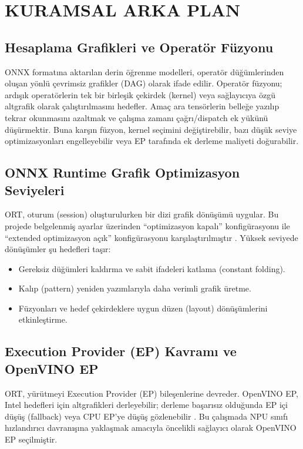 \chapter{KURAMSAL ARKA PLAN}

\section{Hesaplama Grafikleri ve Operatör Füzyonu}
ONNX formatına aktarılan derin öğrenme modelleri, operatör düğümlerinden oluşan yönlü çevrimsiz grafikler (DAG) olarak ifade edilir.
Operatör füzyonu; ardışık operatörlerin tek bir birleşik çekirdek (kernel) veya sağlayıcıya özgü altgrafik olarak çalıştırılmasını hedefler.
Amaç ara tensörlerin belleğe yazılıp tekrar okunmasını azaltmak ve çalışma zamanı çağrı/dispatch ek yükünü düşürmektir.
Buna karşın füzyon, kernel seçimini değiştirebilir, bazı düşük seviye optimizasyonları engelleyebilir veya EP tarafında ek derleme maliyeti doğurabilir.

\section{ONNX Runtime Grafik Optimizasyon Seviyeleri}
ORT, oturum (session) oluşturulurken bir dizi grafik dönüşümü uygular.
Bu projede belgelenmiş ayarlar üzerinden “optimizasyon kapalı” konfigürasyonu ile “extended optimizasyon açık” konfigürasyonu karşılaştırılmıştır \cite{onnxruntime}.
Yüksek seviyede dönüşümler şu hedefleri taşır:
\begin{itemize}
	\item Gereksiz düğümleri kaldırma ve sabit ifadeleri katlama (constant folding).
	\item Kalıp (pattern) yeniden yazımlarıyla daha verimli grafik üretme.
	\item Füzyonları ve hedef çekirdeklere uygun düzen (layout) dönüşümlerini etkinleştirme.
\end{itemize}

\section{Execution Provider (EP) Kavramı ve OpenVINO EP}
ORT, yürütmeyi Execution Provider (EP) bileşenlerine devreder.
OpenVINO EP, Intel hedefleri için altgrafikleri derleyebilir; derleme başarısız olduğunda EP içi düşüş (fallback) veya CPU EP'ye düşüş gözlenebilir \cite{openvino_ep}.
Bu çalışmada NPU sınıfı hızlandırıcı davranışına yaklaşmak amacıyla öncelikli sağlayıcı olarak OpenVINO EP seçilmiştir.

